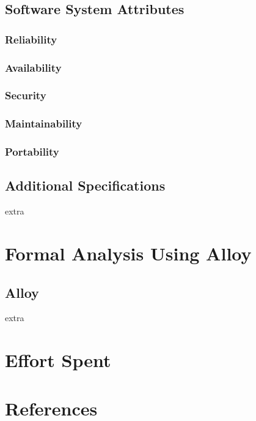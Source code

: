 \documentclass{article}
\begin{document}
	\subsection{Software System Attributes}
		\subsubsection{Reliability}
		\subsubsection{Availability}
		\subsubsection{Security}
		\subsubsection{Maintainability}
		\subsubsection{Portability}
	\subsection{Additional Specifications}
	extra
	
	
\section{Formal Analysis Using Alloy}
	\subsection{Alloy}
	extra
	
	
\section{Effort Spent}

\section{References}	
	
	
	
\end{document}
